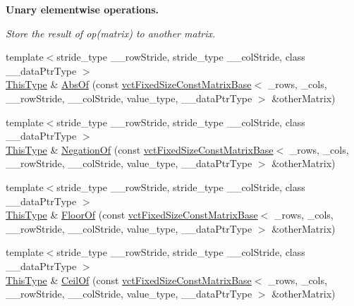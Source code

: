 \begin{Indent}{\bf Unary elementwise operations.}\par
{\em Store the result of op(matrix) to another matrix. }\begin{DoxyCompactItemize}
\item 
{\footnotesize template$<$stride\+\_\+type \+\_\+\+\_\+row\+Stride, stride\+\_\+type \+\_\+\+\_\+col\+Stride, class \+\_\+\+\_\+data\+Ptr\+Type $>$ }\\\hyperlink{classvct_fixed_size_const_matrix_base_a7ec66a96ed7e08ce9ff54093133c9d8d}{This\+Type} \& \hyperlink{classvct_fixed_size_matrix_base_a913ff6b2c7525f9a5e8d757dc00e5150}{Abs\+Of} (const \hyperlink{classvct_fixed_size_const_matrix_base}{vct\+Fixed\+Size\+Const\+Matrix\+Base}$<$ \+\_\+rows, \+\_\+cols, \+\_\+\+\_\+row\+Stride, \+\_\+\+\_\+col\+Stride, value\+\_\+type, \+\_\+\+\_\+data\+Ptr\+Type $>$ \&other\+Matrix)
\item 
{\footnotesize template$<$stride\+\_\+type \+\_\+\+\_\+row\+Stride, stride\+\_\+type \+\_\+\+\_\+col\+Stride, class \+\_\+\+\_\+data\+Ptr\+Type $>$ }\\\hyperlink{classvct_fixed_size_const_matrix_base_a7ec66a96ed7e08ce9ff54093133c9d8d}{This\+Type} \& \hyperlink{classvct_fixed_size_matrix_base_a62706711a47b193fac3b8a933c887d9c}{Negation\+Of} (const \hyperlink{classvct_fixed_size_const_matrix_base}{vct\+Fixed\+Size\+Const\+Matrix\+Base}$<$ \+\_\+rows, \+\_\+cols, \+\_\+\+\_\+row\+Stride, \+\_\+\+\_\+col\+Stride, value\+\_\+type, \+\_\+\+\_\+data\+Ptr\+Type $>$ \&other\+Matrix)
\item 
{\footnotesize template$<$stride\+\_\+type \+\_\+\+\_\+row\+Stride, stride\+\_\+type \+\_\+\+\_\+col\+Stride, class \+\_\+\+\_\+data\+Ptr\+Type $>$ }\\\hyperlink{classvct_fixed_size_const_matrix_base_a7ec66a96ed7e08ce9ff54093133c9d8d}{This\+Type} \& \hyperlink{classvct_fixed_size_matrix_base_a2d72f53871e40f435986c4f6e4c2f423}{Floor\+Of} (const \hyperlink{classvct_fixed_size_const_matrix_base}{vct\+Fixed\+Size\+Const\+Matrix\+Base}$<$ \+\_\+rows, \+\_\+cols, \+\_\+\+\_\+row\+Stride, \+\_\+\+\_\+col\+Stride, value\+\_\+type, \+\_\+\+\_\+data\+Ptr\+Type $>$ \&other\+Matrix)
\item 
{\footnotesize template$<$stride\+\_\+type \+\_\+\+\_\+row\+Stride, stride\+\_\+type \+\_\+\+\_\+col\+Stride, class \+\_\+\+\_\+data\+Ptr\+Type $>$ }\\\hyperlink{classvct_fixed_size_const_matrix_base_a7ec66a96ed7e08ce9ff54093133c9d8d}{This\+Type} \& \hyperlink{classvct_fixed_size_matrix_base_ae7821d82b5e2a678775a4dad933e9d01}{Ceil\+Of} (const \hyperlink{classvct_fixed_size_const_matrix_base}{vct\+Fixed\+Size\+Const\+Matrix\+Base}$<$ \+\_\+rows, \+\_\+cols, \+\_\+\+\_\+row\+Stride, \+\_\+\+\_\+col\+Stride, value\+\_\+type, \+\_\+\+\_\+data\+Ptr\+Type $>$ \&other\+Matrix)
\end{DoxyCompactItemize}
\end{Indent}
